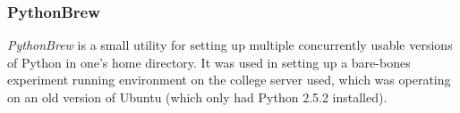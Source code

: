 \documentclass[a4paper,11pt]{report}
\begin{document}
\subsubsection*{PythonBrew}
\emph{PythonBrew} \citep{prog:pythonbrew} is a small utility for setting up multiple concurrently usable versions of Python in one's home directory. It was used in setting up a bare-bones experiment running environment on the college server used, which was operating on an old version of Ubuntu (which only had Python 2.5.2 installed).



\end{document}
